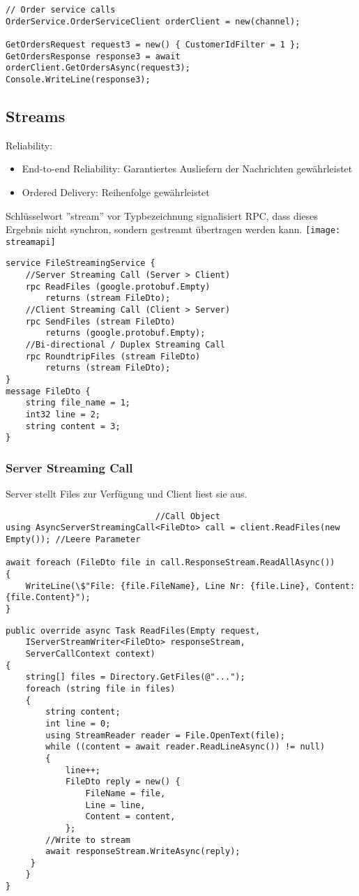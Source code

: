 \begin{multicols*}{2}
\begin{lstlisting}
// Order service calls
OrderService.OrderServiceClient orderClient = new(channel);

GetOrdersRequest request3 = new() { CustomerIdFilter = 1 }; 
GetOrdersResponse response3 = await orderClient.GetOrdersAsync(request3); 
Console.WriteLine(response3);
\end{lstlisting}

\subsection{Streams}
Reliability:
\begin{itemize}
    \item End-to-end Reliability: Garantiertes Ausliefern der Nachrichten gewährleistet
    \item Ordered Delivery: Reihenfolge gewährleistet
\end{itemize}
Schlüsselwort ''stream'' vor Typbezeichnung signalisiert RPC, dass dieses Ergebnis nicht synchron, sondern gestreamt übertragen werden kann.
\texttt{[image: streamapi]}
\begin{lstlisting}
service FileStreamingService {
    //Server Streaming Call (Server > Client)
    rpc ReadFiles (google.protobuf.Empty) 
        returns (stream FileDto);
    //Client Streaming Call (Client > Server)
    rpc SendFiles (stream FileDto)
        returns (google.protobuf.Empty);
    //Bi-directional / Duplex Streaming Call
    rpc RoundtripFiles (stream FileDto)
        returns (stream FileDto);
}
message FileDto {
    string file_name = 1; 
    int32 line = 2; 
    string content = 3;
}
\end{lstlisting}
\subsubsection{Server Streaming Call}
Server stellt Files zur Verfügung und Client liest sie aus.
\begin{lstlisting}
                              //Call Object                    
using AsyncServerStreamingCall<FileDto> call = client.ReadFiles(new Empty()); //Leere Parameter

await foreach (FileDto file in call.ResponseStream.ReadAllAsync()) 
{
    WriteLine(\$"File: {file.FileName}, Line Nr: {file.Line}, Content: {file.Content}"); 
}
\end{lstlisting}
\begin{lstlisting}
public override async Task ReadFiles(Empty request,
    IServerStreamWriter<FileDto> responseStream,
    ServerCallContext context)
{
    string[] files = Directory.GetFiles(@"..."); 
    foreach (string file in files)
    {
        string content; 
        int line = 0;
        using StreamReader reader = File.OpenText(file);
        while ((content = await reader.ReadLineAsync()) != null)
        {
            line++;
            FileDto reply = new() {
                FileName = file, 
                Line = line, 
                Content = content,
            };
        //Write to stream
        await responseStream.WriteAsync(reply);
     }
    } 
}
\end{lstlisting}

\end{multicols*}
